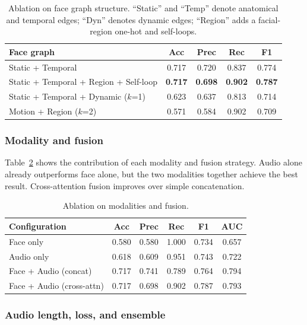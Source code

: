 \documentclass[conference]{IEEEtran}
\begin{document}
\begin{table}[t]
\centering
\caption{Ablation on face graph structure. ``Static'' and ``Temp'' denote anatomical and temporal edges; ``Dyn'' denotes dynamic edges; ``Region'' adds a facial-region one-hot and self-loops.}
\label{tab:graph_ablation}
\small
\begin{tabular}{lcccc}
\toprule
Face graph & Acc & Prec & Rec & F1 \\
\midrule
Static + Temporal & 0.717 & 0.720 & 0.837 & 0.774 \\
Static + Temporal + Region + Self-loop & \textbf{0.717} & \textbf{0.698} & \textbf{0.902} & \textbf{0.787} \\
Static + Temporal + Dynamic ($k$=1) & 0.623 & 0.637 & 0.813 & 0.714 \\
Motion + Region ($k$=2) & 0.571 & 0.584 & 0.902 & 0.709 \\
\bottomrule
\end{tabular}
\end{table}

\subsubsection{Modality and fusion}

Table~\ref{tab:fusion_ablation} shows the contribution of each modality and fusion strategy.
Audio alone already outperforms face alone, but the two modalities together achieve the best result.
Cross-attention fusion improves over simple concatenation.

\begin{table}[t]
\centering
\caption{Ablation on modalities and fusion.}
\label{tab:fusion_ablation}
\small
\begin{tabular}{lccccc}
\toprule
Configuration & Acc & Prec & Rec & F1 & AUC \\
\midrule
Face only & 0.580 & 0.580 & 1.000 & 0.734 & 0.657 \\
Audio only & 0.618 & 0.609 & 0.951 & 0.743 & 0.722 \\
Face + Audio (concat) & 0.717 & 0.741 & 0.789 & 0.764 & 0.794 \\
Face + Audio (cross-attn) & 0.717 & 0.698 & 0.902 & 0.787 & 0.793 \\
\bottomrule
\end{tabular}
\end{table}

\subsubsection{Audio length, loss, and ensemble}
\end{document}
